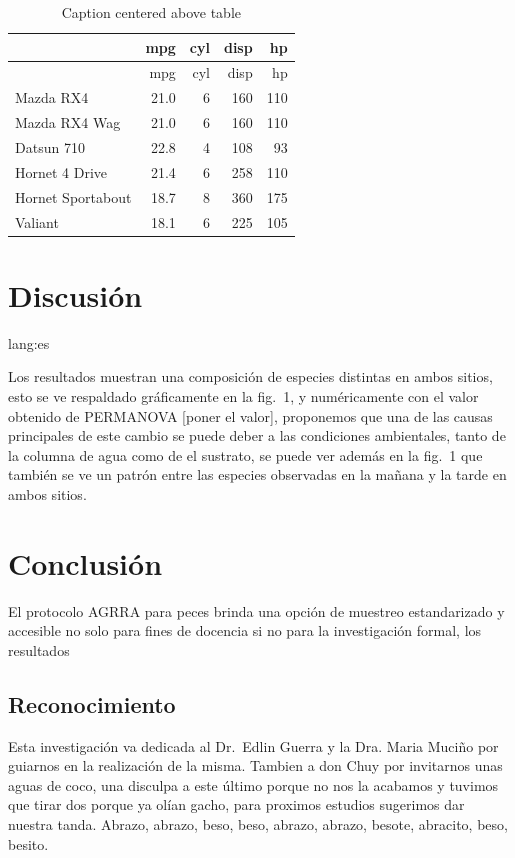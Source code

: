\documentclass[
  authoryear,
  preprint,
  3p]{elsarticle}
\begin{document}
\hypertarget{tbl-simple}{}
\begin{longtable}[]{@{}lrrrr@{}}
\caption{\label{tbl-simple}Caption centered above table}\tabularnewline
\toprule\noalign{}
& mpg & cyl & disp & hp \\
\midrule\noalign{}
\endfirsthead
\toprule\noalign{}
& mpg & cyl & disp & hp \\
\midrule\noalign{}
\endhead
\bottomrule\noalign{}
\endlastfoot
Mazda RX4 & 21.0 & 6 & 160 & 110 \\
Mazda RX4 Wag & 21.0 & 6 & 160 & 110 \\
Datsun 710 & 22.8 & 4 & 108 & 93 \\
Hornet 4 Drive & 21.4 & 6 & 258 & 110 \\
Hornet Sportabout & 18.7 & 8 & 360 & 175 \\
Valiant & 18.1 & 6 & 225 & 105 \\
\end{longtable}

\hypertarget{discusiuxf3n}{%
\section*{Discusión}\label{discusiuxf3n}}

lang:es

Los resultados muestran una composición de especies distintas en ambos
sitios, esto se ve respaldado gráficamente en la fig.~1, y numéricamente
con el valor obtenido de PERMANOVA {[}poner el valor{]}, proponemos que
una de las causas principales de este cambio se puede deber a las
condiciones ambientales, tanto de la columna de agua como de el
sustrato, se puede ver además en la fig.~1 que también se ve un patrón
entre las especies observadas en la mañana y la tarde en ambos sitios.

\hypertarget{conclusiuxf3n}{%
\section*{Conclusión}\label{conclusiuxf3n}}

El protocolo AGRRA para peces brinda una opción de muestreo
estandarizado y accesible no solo para fines de docencia si no para la
investigación formal, los resultados

\hypertarget{reconocimiento}{%
\subsection{Reconocimiento}\label{reconocimiento}}

Esta investigación va dedicada al Dr.~Edlin Guerra y la Dra. Maria
Muciño por guiarnos en la realización de la misma. Tambien a don Chuy
por invitarnos unas aguas de coco, una disculpa a este último porque no
nos la acabamos y tuvimos que tirar dos porque ya olían gacho, para
proximos estudios sugerimos dar nuestra tanda. Abrazo, abrazo, beso,
beso, abrazo, abrazo, besote, abracito, beso, besito.


\renewcommand\refname{References}
  
\end{document}
